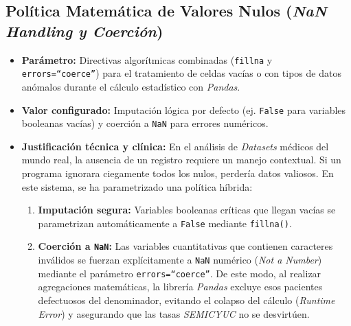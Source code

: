 \subsection{Política Matemática de Valores Nulos (\textit{NaN Handling y Coerción})}
\begin{itemize}
    \item \textbf{Parámetro:} Directivas algorítmicas combinadas (\texttt{fillna} y \texttt{errors=``coerce''}) para el tratamiento de celdas vacías o con tipos de datos anómalos durante el cálculo estadístico con \textit{Pandas}.
    \item \textbf{Valor configurado:} Imputación lógica por defecto (ej. \texttt{False} para variables booleanas vacías) y coerción a \texttt{NaN} para errores numéricos.
    \item \textbf{Justificación técnica y clínica:} En el análisis de \textit{Datasets} médicos del mundo real, la ausencia de un registro requiere un manejo contextual. Si un programa ignorara ciegamente todos los nulos, perdería datos valiosos. En este sistema, se ha parametrizado una política híbrida:
    \begin{enumerate}
        \item \textbf{Imputación segura:} Variables booleanas críticas que llegan vacías se parametrizan automáticamente a \texttt{False} mediante \texttt{fillna()}.
        \item \textbf{Coerción a \texttt{NaN}:} Las variables cuantitativas que contienen caracteres inválidos se fuerzan explícitamente a \texttt{NaN} numérico (\textit{Not a Number}) mediante el parámetro \texttt{errors=``coerce''}. De este modo, al realizar agregaciones matemáticas, la librería \textit{Pandas} excluye esos pacientes defectuosos del denominador, evitando el colapso del cálculo (\textit{Runtime Error}) y asegurando que las tasas \textit{SEMICYUC} no se desvirtúen.
    \end{enumerate}
\end{itemize}

